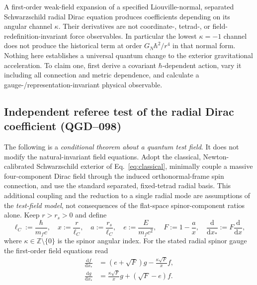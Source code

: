 \documentclass[11pt,a4paper]{article}
\newcommand{\dd}{\mathrm d}
\begin{document}
A first-order weak-field expansion of a specified Liouville-normal,
separated Schwarzschild radial Dirac equation produces coefficients
depending on its angular channel $\kappa$. Their derivatives are
not coordinate-, tetrad-, or field-redefinition-invariant force
observables. In particular the lowest $\kappa=-1$ channel does not
produce the historical term at order $G_N\hbar^2/r^4$ in that normal
form. Nothing here establishes a universal quantum change to the
exterior gravitational acceleration. To claim one, first derive a
covariant $\hbar$-dependent action, vary it including all connection
and metric dependence, and calculate a gauge-/representation-invariant
physical observable.



\subsection{Independent referee test of the radial Dirac coefficient (QGD--098)}
\label{sec:radial-referee}
The following is a \emph{conditional theorem about a quantum test field}.
It does not modify the natural-invariant field equations. Adopt the
classical, Newton-calibrated Schwarzschild exterior of
Eq.~\eqref{eq:classical}, minimally couple a massive four-component
Dirac field through the induced orthonormal-frame spin connection,
and use the standard separated, fixed-tetrad radial basis. This
additional coupling and the reduction to a single radial mode are
assumptions of the \emph{test-field model}, not consequences of the
flat-space spinor-component ratios alone. Keep $r>r_s>0$ and define
\begin{equation}\label{eq:radial-parameters}
\ell_C:=\frac{\hbar}{m_fc},\quad x:=\frac r{\ell_C},\quad
 a:=\frac{r_s}{\ell_C},\quad e:=\frac{E}{m_fc^2},\quad
 F:=1-\frac ax,\quad \frac{\dd}{\dd x_*}:=F\frac{\dd}{\dd x},
\end{equation}
where $\kappa\in\mathbb Z\setminus\{0\}$ is the spinor angular
index. For the stated radial spinor gauge the first-order field
equations read
\begin{equation}\label{eq:radial-first-order}
\boxed{\begin{aligned}
\frac{\dd f}{\dd x_*}&=(e+\sqrt F)g-\frac{\kappa\sqrt F}{x}f,\\
\frac{\dd g}{\dd x_*}&=\frac{\kappa\sqrt F}{x}g+(\sqrt F-e)f.
\end{aligned}}
\end{equation}
\end{document}
